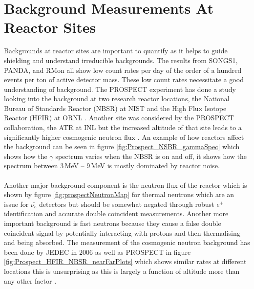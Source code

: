 \section{Background Measurements At Reactor Sites}
Backgrounds at reactor sites are important to quantify as it helps to guide shielding and understand irreducible backgrounds. The results from SONGS1, PANDA, and RMon all show low count rates per day of the order of a hundred events per ton of active detector mass. These low count rates necessitate a good understanding of background. The PROSPECT experiment has done a  study looking into the background at two research reactor locations, the National Bureau of Standards Reactor (NBSR) at NIST and the High Flux Isotope Reactor (HFIR) at ORNL \cite{Ashenfelter_2016}. Another site was considered by the PROSPECT collaboration, the ATR at INL but the increased altitude of that site leads to a significantly higher cosmogenic neutron flux \cite{Ashenfelter_2016}. An example of how reactors affect the background can be seen in figure \ref{fig:Prospect_NSBR_gammaSpec} which shows how the $\gamma$ spectrum varies when the NBSR is on and off, it shows how the spectrum between 3\,MeV -- 9\,MeV is mostly dominated by reactor noise. 
\\\\Another major background component is the neutron flux of the reactor which is shown by figure \ref{fig:prospectNeutronMap} for thermal neutrons which are an issue for $\bar{\nu_e}$ detectors but should be somewhat negated through robust $e^+$ identification and accurate double coincident measurements. Another more important background is fast neutrons because they cause a false double coincident signal by potentially interacting with protons and then thermalising and being absorbed. The measurement of the cosmogenic neutron background has been done by JEDEC in 2006 \cite{JEDEC_2006} as well as PROSPECT in figure \ref{fig:Prospect_HFIR_NBSR_nearFarPlots} which shows similar rates at different locations this is unsurprising as this is largely a function of altitude more than any other factor \cite{Ashenfelter_2016}. 
